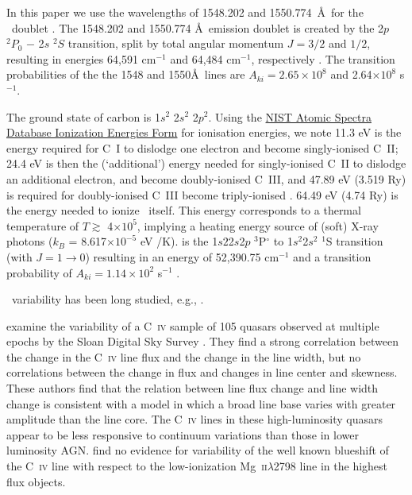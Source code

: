 \documentclass[a4paper,fleqn,usenatbib]{mnras}
\begin{document}
In this paper we use the wavelengths of 1548.202 and 1550.774~\AA\ for
the \civ\ doublet \citep{Kramida2018}.  The 1548.202 and 1550.774 \AA\
emission doublet is created by the 2$p$ $^{2}P_{0}$ $-$ 2$s$ $^{2}S$
transition, split by total angular momentum $J= 3/2$ and $1/2$,
resulting in energies 64,591 cm$^{-1}$ and 64,484 cm$^{-1}$,
respectively \citep[e.g.][]{Moore1993}. The transition probabilities
of the the 1548 and 1550\AA\ lines are $A_{ki}= 2.65\times10^{8}$ and
2.64$\times10^{8}$ s$^{-1}$. 

The ground state of carbon is 1$s^2$ 2$s^2$ 2$p^2$. Using the
\href{https://physics.nist.gov/PhysRefData/ASD/ionEnergy.html}{NIST
Atomic Spectra Database Ionization Energies Form} for ionisation
energies, we note 11.3 eV is the energy required for C~I to dislodge
one electron and become singly-ionised C~II; 24.4 eV is then the
(`additional') energy needed for singly-ionised C~II to dislodge an
additional electron, and become doubly-ionised C~III, and 47.89 eV
(3.519 Ry) is required for doubly-ionised C~III become triply-ionised
\civ.  64.49 eV (4.74 Ry) is the energy needed to ionize \civ\
itself. This energy corresponds to a thermal temperature of $T
\gtrsim$ 4$\times10^{5}$, implying a heating energy source of (soft)
X-ray photons ($k_{B}$ = 8.617$\times 10^{-5}$ eV /K).  \ciii is the
1$s2$2$s$2$p$ $^{3}$P$^{\circ}$ to 1$s^{2}$2$s^{2}$ $^{1}$S transition
(with $J=1\rightarrow0$) resulting in an energy of 52,390.75 cm$^{-1}$ and
a transition probability of $A_{ki} = 1.14\times10^{2}$ s$^{-1}$ \citep{Wiese1996}. 

\civ\ variability has been long studied, e.g., \citet[][]{Baldwin1977,
Gaskell1982, Gregory1982, Wilkes1986, Espey1989, Espey1990Erratum,
ZhengSulentic1990, Corbin1990, Corbin1991, Weymann1991,
Dimitrijevic1992, TytlerFan1992, Wills1993, Brotherton1994, Osmer1994,
Laor1995, McIntosh1999, Nazarova2003}.

\citet{Wilhite2006} examine the variability of a C~\textsc{iv} sample
of 105 quasars observed at multiple epochs by the Sloan Digital Sky
Survey \citep[SDSS;][]{York2000, Stoughton2002, Abazajian2009}.  They
find a strong correlation between the change in the C~\textsc{iv} line
flux and the change in the line width, but no correlations between the
change in flux and changes in line center and skewness.  These authors
find that the relation between line flux change and line width change
is consistent with a model in which a broad line base varies with
greater amplitude than the line core. The C~\textsc{iv} lines in these
high-luminosity quasars appear to be less responsive to continuum
variations than those in lower luminosity AGN.  \citet{Wilhite2006}
find no evidence for variability of the well known blueshift of the
C~\textsc{iv} line with respect to the low-ionization
Mg~\textsc{ii}$\lambda$2798 line in the highest flux objects.
\end{document}
